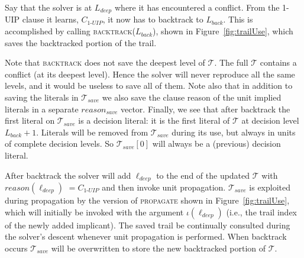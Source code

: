 \documentclass[runningheads]{llncs}
\newcommand{\trail}{\ensuremath{\mathcal{T}}}
\newcommand{\trailIdx}[1]{\ensuremath{\iota(#1)}}
\newcommand{\reason}[1]{\ensuremath{\mathit{reason}(#1)}}
\newcommand{\uipcls}{C_{\textit{1-UIP}}}
\newcommand{\deepestLvl}{L_{\textit{deep}}}
\newcommand{\deepestLit}{\ell_{\textit{deep}}}
\newcommand{\btL}{L_{\textit{back}}}
\newcommand{\trailsave}{\trail_{\mathit{save}}}
\newcommand{\bt}{\textsc{backtrack}\xspace}
\begin{document}
Say that the solver is at $\deepestLvl$ where it has encountered a
conflict. From the 1-UIP clause it learns, $\uipcls$, it now has to
backtrack to $\btL$. This is accomplished by calling
\textsc{backtrack($\btL$)}, shown in Figure~\ref{fig:trailUse}, which
saves the backtracked portion of the trail.

Note that \bt does not save the deepest level of $\trail$. The full
$\trail$ contains a conflict (at its deepest level). Hence the solver
will never reproduce all the same levels, and it would be useless to
save all of them. Note also that in addition to saving the literals in
$\trailsave$ we also save the clause reason of the unit implied
literals in a separate $\mathit{reason_{save}}$ vector. Finally, we
see that after backtrack the first literal on $\trailsave$ is a
decision literal: it is the first literal of $\trail$ at decision
level $\btL+1$. Literals will be removed from $\trailsave$ during its
use, but always in units of complete decision levels. So
$\trailsave[0]$ will always be a (previous) decision literal.

After backtrack the solver will add $\deepestLit$ to the end of the
updated $\trail$ with $\reason{\deepestLit}$ $\mbox{}=\uipcls$ and
then invoke unit propagation. $\trailsave$ is exploited during
propagation by the version of \textsc{propagate} shown in
Figure~\ref{fig:trailUse}, which will initially be invoked with the
argument $\trailIdx{\deepestLit}$ (i.e., the trail index of the newly
added implicant). The saved trail be continually consulted during the
solver's descent whenever unit propagation is performed. When
backtrack occurs $\trailsave$ will be overwritten to store the new
backtracked portion of $\trail$.
\end{document}
